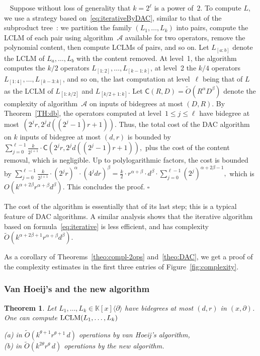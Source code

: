\documentclass{sig-alt-full}
\def\myproof{\noindent{\sc Proof.}~}
\def\foorp{\hfill$\square$}
\def\C {\ensuremath{\mathsf{C}}}
\def\K {\ensuremath{\mathbb{K}}}
\newcommand{\x}{x}
\newcommand{\Dx}{\partial}
\newcommand{\lclm} { {\rm LCLM}}
\newcommand{\bigOsoft}{\widetilde{{O}}}
\newtheorem{theorem}{Theorem}
\begin{document}
\myproof
Suppose without loss of generality that $k=2^\ell$ is a power of~$2$.	
To compute $L$, we  use a strategy based on~\eqref{eq:iterativeByDAC}, similar to that of the subproduct tree~\cite[\S10.1]{GaGe03}: we partition the family $(L_1, \ldots, L_k)$ into pairs, compute the LCLM of each pair using algorithm~$\mathcal{A}$ available for two operators, remove the polynomial content, then compute LCLMs of pairs, and so on. Let $L_{[a:b]}$ denote the LCLM of $L_a, \ldots, L_{b}$ with the content removed.
At level~1, the algorithm computes the $k/2$ operators $L_{[1:2]}, \ldots, L_{[k-1:k]}$, at level~2 the $k/4$ operators $L_{[1:4]}, \ldots, L_{[k-3:k]}$, and so on, the last computation at level~$\ell$ being that of $L$ as the LCLM of $L_{[1:k/2]}$ and $L_{[k/2+1:k]}$. Let $\C(R,D) = \bigOsoft (R^\alpha D^\beta)$ denote the complexity of algorithm~$\mathcal{A}$ on inputs of bidegrees at most $(D,R)$.
By Theorem~\ref{TH:db}, the operators computed at level~$1\leq j\leq \ell$ have bidegree at most~$(2^j r, 2^j d((2^j-1)r+1))$.
Thus, the total cost of the DAC algorithm on $k$ inputs of bidegree at most $(d,r)$ is bounded by
$ \sum_{j=0}^{\ell - 1} \frac{k}{2^{j+1}} \cdot \C \left( 2^j r, 2^jd ((2^j-1)r+1) \right), $
plus the cost of the content removal, which is negligible. 
Up to polylogarithmic factors, the cost is bounded by
$ \displaystyle{\sum_{j=0}^{\ell - 1} \frac{k}{2^{j+1}} \cdot (2^j r)^\alpha \cdot (4^j dr)^\beta = \frac{k}{2} \cdot r^{\alpha + \beta} \cdot d^\beta \cdot \sum_{j=0}^{\ell - 1}  (2^j)^{\alpha+2\beta-1}, }$
which is $O(k^{\alpha+2\beta} r^{\alpha+\beta} d^\beta)$. This concludes the proof.
\foorp	

The cost of the algorithm is essentially that of its last step; this is a typical feature of DAC
algorithms.
A similar analysis shows that the iterative algorithm based on
formula~\eqref{eq:iterative} is less efficient, and has complexity
$\bigOsoft(k^{\alpha+2\beta+1} r^{\alpha+\beta} d^\beta)$.

\smallskip As a corollary of Theorems~\ref{theo:compl-2ops}
and~\ref{theo:DAC}, we get a proof of the complexity estimates in the
first three entries of Figure~\ref{fig:complexity}.

\subsubsection{Van Hoeij's and the new algorithm}
\vspace{-0.3cm}
\begin{theorem}\label{theo:compl-kops}
Let $L_1, \ldots, L_k \in \K[\x]\langle
\Dx\rangle$ have bidegrees at most $(d,r)$ in $(x,\Dx)$.	
One can compute $\lclm(L_1,\ldots,L_k)$ 
\begin{tabbing}
	\quad \emph{(a)} in $\bigOsoft(k^{\theta+1} r^{\theta+1} \, d)$ operations by van Hoeij's algorithm,	\\
	\quad \emph{(b)} in $\bigOsoft(k^{2\theta} r^{\theta} \, d)$ operations by the new algorithm. 
\end{tabbing}
\end{theorem}
\end{document}

